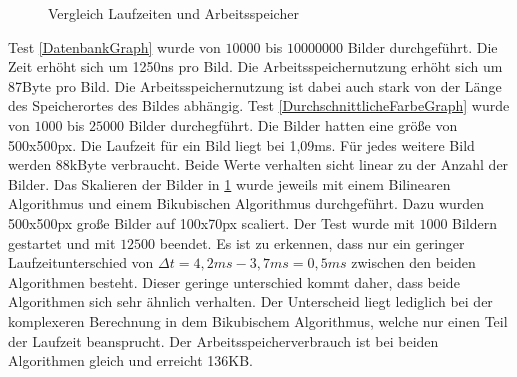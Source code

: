 \begin{figure}
{
        \label{SkalierenGraph}
    }
    
    \caption[Laufzeit]{Vergleich Laufzeiten und Arbeitsspeicher}
\end{figure}
Test \ref{DatenbankGraph} wurde von $10000$ bis $10000000$ Bilder durchgeführt. Die Zeit erhöht sich um 1250ns pro Bild. Die Arbeitsspeichernutzung erhöht sich um 87Byte pro Bild. Die Arbeitsspeichernutzung ist dabei auch stark von der Länge des Speicherortes des Bildes abhängig.
\newline
Test \ref{DurchschnittlicheFarbeGraph} wurde von $1000$ bis $25000$ Bilder durchegführt. Die Bilder hatten eine größe von 500x500px. Die Laufzeit für ein Bild liegt bei 1,09ms. Für jedes weitere Bild werden 88kByte verbraucht. Beide Werte verhalten sicht linear zu der Anzahl der Bilder.
\newline
Das Skalieren der Bilder in \ref{SkalierenGraph} wurde jeweils mit einem Bilinearen Algorithmus und einem Bikubischen Algorithmus durchgeführt. Dazu wurden 500x500px große Bilder auf 100x70px scaliert. Der Test wurde mit $1000$ Bildern gestartet und mit $12500$ beendet. Es ist zu erkennen, dass nur ein geringer Laufzeitunterschied von $\Delta t = 4,2ms - 3,7ms = 0,5ms$ zwischen den beiden Algorithmen besteht. Dieser geringe unterschied kommt daher, dass beide Algorithmen sich sehr ähnlich verhalten. Der Unterscheid liegt lediglich bei der komplexeren Berechnung in dem Bikubischem Algorithmus, welche nur einen Teil der Laufzeit beansprucht. Der Arbeitsspeicherverbrauch ist bei beiden Algorithmen gleich und erreicht 136KB.
